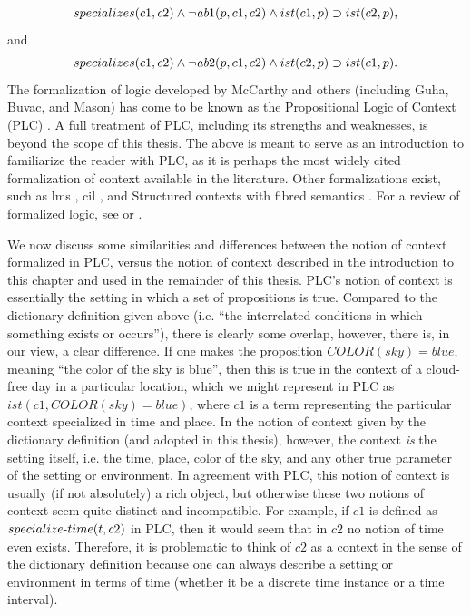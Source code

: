 \begin{equation}
specializes(c1,c2) \land \lnot \hbox{\it ab}1(p,c1,c2) \land ist(c1,p)
\supset ist(c2,p),\label{spec1}
\end{equation}
%
and
%
\begin{equation}
specializes(c1,c2) \land \lnot \hbox{\it ab}2(p,c1,c2) \land ist(c2,p)
\supset ist(c1,p). 
\end{equation}
%
The formalization of logic developed by McCarthy and others (including Guha, Buvac, and Mason) has come to be known as the Propositional Logic of Context (PLC) \cite{buvac1993propositional}. A full treatment of PLC, including its strengths and weaknesses, is beyond the scope of this thesis. The above is meant to serve as an introduction to familiarize the reader with PLC, as it is perhaps the most widely cited formalization of context available in the literature. Other formalizations exist, such as \gls{lms} \cite{ghidini2001local}, \gls{cil} \cite{thomason2006contextual}, and Structured contexts with fibred semantics \cite{gabbay2000structured}. For a review of formalized logic, see \cite{bouquet2003theories} or \cite{boquet2001}.

We now discuss some similarities and differences between the notion of context formalized in PLC, versus the notion of context described in the introduction to this chapter and used in the remainder of this thesis. PLC's notion of context is essentially the setting in which a set of propositions is true. Compared to the dictionary definition given above (i.e. ``the interrelated conditions in which something exists or occurs''), there is clearly some overlap, however, there is, in our view, a clear difference. If one makes the proposition $COLOR(sky) = blue$, meaning ``the color of the sky is blue'', then this is true in the context of a cloud-free day in a particular location, which we might represent in PLC as $ist(c1, COLOR(sky) = blue)$, where $c1$ is a term representing the particular context specialized in time and place. In the notion of context given by the dictionary definition (and adopted in this thesis), however, the context \emph{is} the setting itself, i.e. the time, place, color of the sky, and any other true parameter of the setting or environment. In agreement with PLC, this notion of context is usually (if not absolutely) a rich object, but otherwise these two notions of context seem quite distinct and incompatible. For example, if $c1$ is defined as $specialize\textnormal{-}time(t, c2)$ in PLC, then it would seem that in $c2$ no notion of time even exists. Therefore, it is problematic to think of $c2$ as a context in the sense of the dictionary definition because one can always describe a setting or environment in terms of time (whether it be a discrete time instance or a time interval).

